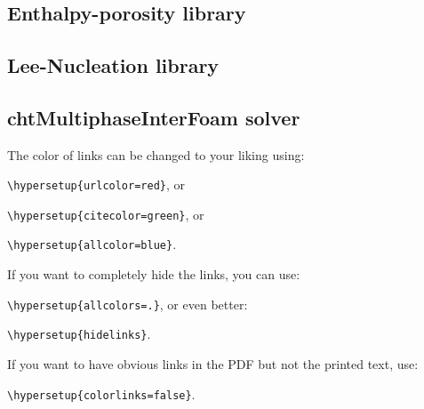 
\chapter{} %

\label{AppendixA} %

\section{Enthalpy-porosity library}

\section{Lee-Nucleation library}
\section{chtMultiphaseInterFoam solver}
The color of links can be changed to your liking using:

{\small\verb!\hypersetup{urlcolor=red}!}, or

{\small\verb!\hypersetup{citecolor=green}!}, or

{\small\verb!\hypersetup{allcolor=blue}!}.

\noindent If you want to completely hide the links, you can use:

{\small\verb!\hypersetup{allcolors=.}!}, or even better: 

{\small\verb!\hypersetup{hidelinks}!}.

\noindent If you want to have obvious links in the PDF but not the printed text, use:

{\small\verb!\hypersetup{colorlinks=false}!}.

